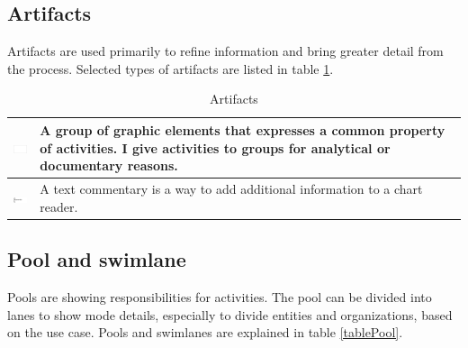 \documentclass[thesis=M,english]{FITthesis}[2019/12/23]
\begin{document}
\subsection{Artifacts}

Artifacts are used primarily to refine information and bring greater detail from the process. Selected types of artifacts are listed in table \ref{tableArtefakt}.


\begin{table}[ht!]
\caption{Artifacts} \label{tableArtefakt}
\begin{center}
\begin{tabular}{ | p{1cm} | m{8cm} | } \hline
    \includegraphics[width=1cm]{assets/BPNMicons/Skupina.pdf} & A group of graphic elements that expresses a common property of activities. I give activities to groups for analytical or documentary reasons. \\   \hline
    \includegraphics[width=1cm]{assets/BPNMicons/Komentar.pdf} &A text commentary is a way to add additional information to a chart reader.  \\ \hline
\end{tabular}
\end{center}
\end{table}




\subsection{Pool and swimlane}
Pools are showing responsibilities for activities. The pool can be divided into lanes to show mode details, especially to divide entities and organizations, based on the use case. Pools and swimlanes are explained in table \ref{tablePool}.
\end{document}

